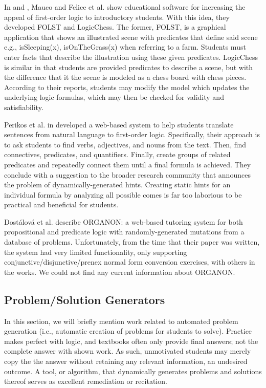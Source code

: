\documentclass[ms]{uncgdissertationexp2}
\theoremstyle{plain}
\theoremstyle{definition}
\theoremstyle{remark}
\begin{document}
In \cite{felice} and \cite{mauco}, Mauco and Felice et al. show educational software for increasing the appeal of first-order logic to introductory students. With this idea, they developed FOLST and LogicChess. The former, FOLST, is a graphical application that shows an illustrated scene with predicates that define said scene e.g., isSleeping(x), isOnTheGrass(x) when referring to a farm. Students must enter facts that describe the illustration using these given predicates. LogicChess is similar in that students are provided predicates to describe a scene, but with the difference that it the scene is modeled as a chess board with chess pieces. According to their reports, students may modify the model which updates the underlying logic formulas, which may then be checked for validity and satisfiability. 

Perikos et al. in \cite{perikos} developed a web-based system to help students translate sentences from natural language to first-order logic. Specifically, their approach is to ask students to find verbs, adjectives, and nouns from the text. Then, find connectives, predicates, and quantifiers. Finally, create groups of related predicates and repeatedly connect them until a final formula is achieved. They conclude with a suggestion to the broader research community that announces the problem of dynamically-generated hints. Creating static hints for an individual formula by analyzing all possible comes is far too laborious to be practical and beneficial for students.

Dost\'alov\'a et al. \cite{organon} describe ORGANON: a web-based tutoring system for both propositional and predicate logic with randomly-generated mutations from a database of problems. Unfortunately, from the time that their paper was written, the system had very limited functionality, only supporting conjunctive/disjunctive/prenex normal form conversion exercises, with others in the works. We could not find any current information about ORGANON.

\subsection{Problem/Solution Generators}
In this section, we will briefly mention work related to automated problem generation (i.e., automatic creation of problems for students to solve). Practice makes perfect with logic, and textbooks often only provide final answers; not the complete answer with shown work. As such, unmotivated students may merely copy the the answer without retaining any relevant information, an undesired outcome. A tool, or algorithm, that dynamically generates problems and solutions thereof serves as excellent remediation or recitation.
\end{document}
